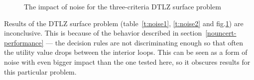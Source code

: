 \begin{figure}
  \centering
  \caption{The impact of noise for the three-criteria DTLZ surface problem}
  \label{c3_surface_noise}
\end{figure}

Results of the DTLZ surface problem (table~\ref{t:noise1}, \ref{t:noise2} and
fig.\ref{c3_surface_noise}) are inconclusive. This is because of the behavior
described in section~\ref{nouncert-performance} --- the decision rules are not
discriminating enough so that often the utility value drops between the
interior loops. This can be seen as a form of noise with even bigger impact
than the one tested here, so it obscures results for this particular problem.

